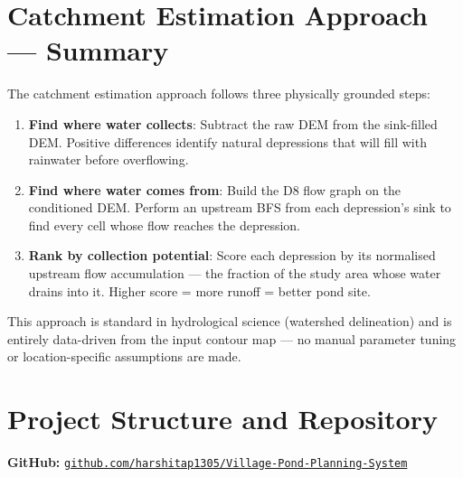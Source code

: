 \documentclass[12pt,a4paper]{article}
\begin{document}
\section{Catchment Estimation Approach --- Summary}

The catchment estimation approach follows three physically grounded steps:

\begin{enumerate}
    \item \textbf{Find where water collects}: Subtract the raw DEM from the
          sink-filled DEM. Positive differences identify natural depressions that will
          fill with rainwater before overflowing.

    \item \textbf{Find where water comes from}: Build the D8 flow graph on the
          conditioned DEM. Perform an upstream BFS from each depression's sink to find
          every cell whose flow reaches the depression.

    \item \textbf{Rank by collection potential}: Score each depression by its
          normalised upstream flow accumulation --- the fraction of the study area whose
          water drains into it. Higher score = more runoff = better pond site.
\end{enumerate}

This approach is standard in hydrological science (watershed delineation) and is
entirely data-driven from the input contour map --- no manual parameter tuning or
location-specific assumptions are made.

\section{Project Structure and Repository}

\textbf{GitHub:}
\href{https://github.com/harshitap1305/Village-Pond-Planning-System}{\texttt{github.com/harshitap1305/Village-Pond-Planning-System}}
\end{document}
